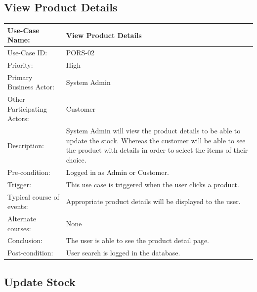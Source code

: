 \subsection{View Product Details}
\begin{center}
    \begin{tabular}{ @{}|p{7cm}||p{7cm}|  }
    \hline
    Use-Case Name: & View Product Details  \\ \hline
    Use-Case ID: & PORS-02 \\ \hline
    Priority: & High \\ \hline
    Primary Business Actor: & System Admin \\ \hline
    Other Participating Actors: & Customer \\ \hline
    Description: & System Admin will view the product details to be able to update the stock. Whereas the customer will be able to see the product with details in order to select the items of their choice. \\ \hline
    Pre-condition: & Logged in as Admin or Customer.  \\ \hline
    Trigger: & This use case is triggered when the user clicks a product. \\ \hline
    Typical course of events: & Appropriate product details will be displayed to the user. \\ \hline
    Alternate courses: & None \\ \hline
    Conclusion: &  The user is able to see the product detail page.\\ \hline
    Post-condition: & User search is logged in the database.  \\ \hline
    \end{tabular}
\end{center}

\subsection{Update Stock}

